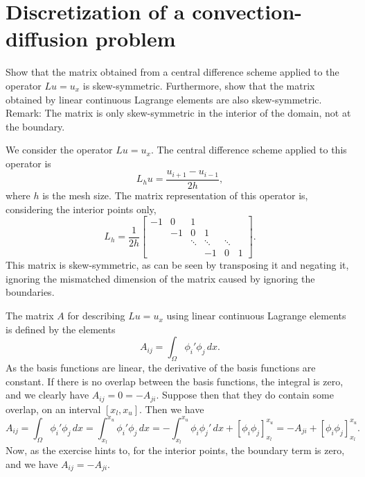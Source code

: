 \section{Discretization of a convection-diffusion problem}

\begin{exercise}
    Show that the matrix obtained from a central difference scheme applied to the operator $L u = u_x$ is skew-symmetric.
    Furthermore, show that the matrix obtained by linear continuous Lagrange elements are also skew-symmetric.
    Remark: The matrix is only skew-symmetric in the interior of the domain, not at the boundary.
\end{exercise}

\begin{solution}
    We consider the operator $L u = u_x$.
    The central difference scheme applied to this operator is
    \begin{equation*}
        L_h u = \frac{u_{i+1} - u_{i-1}}{2h},
    \end{equation*}
    where $h$ is the mesh size.
    The matrix representation of this operator is, considering the interior points only,
    \begin{equation*}
        L_h = \frac{1}{2h}
        \begin{bmatrix}
            -1 & 0 & 1 \\
            & -1 & 0 & 1 \\
            && \ddots & \ddots & \ddots \\
            &&& -1 & 0 & 1
        \end{bmatrix}.
    \end{equation*}
    This matrix is skew-symmetric, as can be seen by transposing it and negating it, ignoring the mismatched dimension of the matrix caused by ignoring the boundaries.

    The matrix $A$ for describing $L u = u_x$ using linear continuous Lagrange elements is defined by the elements
    \begin{equation*}
        A_{ij} = \int_{\Omega} \phi_i' \phi_j \, dx.
    \end{equation*}
    As the basis functions are linear, the derivative of the basis functions are constant.
    If there is no overlap between the basis functions, the integral is zero, and we clearly have $A_{ij} = 0 = -A_{ji}$.
    Suppose then that they do contain some overlap, on an interval $[x_l, x_u]$.
    Then we have
    \begin{equation*}
        A_{ij} = \int_{\Omega} \phi_i' \phi_j \, dx = \int_{x_l}^{x_u} \phi_i' \phi_j \, dx = -\int_{x_l}^{x_u} \phi_i \phi_j' \, dx + \left[ \phi_i \phi_j \right]_{x_l}^{x_u} = -A_{ji} + \left[ \phi_i \phi_j \right]_{x_l}^{x_u}.
    \end{equation*}
    Now, as the exercise hints to, for the interior points, the boundary term is zero, and we have $A_{ij} = -A_{ji}$.
\end{solution}

